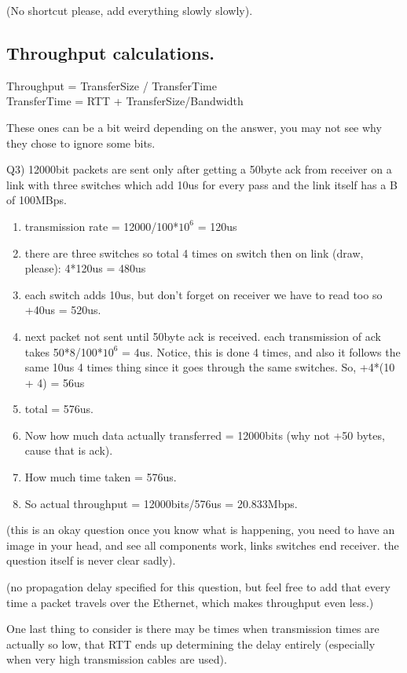\documentclass[12pt]{book}
\begin{document}
(No shortcut please, add everything slowly slowly).

\subsection{Throughput calculations.}

Throughput = TransferSize / TransferTime \\
TransferTime = RTT + TransferSize/Bandwidth\par

These ones can be a bit weird depending on the answer, you may not see why they chose to ignore some bits.\par
Q3) 12000bit packets are sent only after getting a 50byte ack from receiver on a link with three switches which add 10us for every pass and the link itself has a B of 100MBps.
\begin{enumerate}
    \item transmission rate = 12000/100*$10^{6}$ = 120us
    \item there are three switches so total 4 times on switch then on link (draw, please): 4*120us = 480us
    \item each switch adds 10us, but don't forget on receiver we have to read too so +40us = 520us.
    \item next packet not sent until 50byte ack is received. each transmission of ack takes 50*8/100*$10^{6}$ = 4us. Notice, this is done 4 times, and also it follows the same 10us 4 times thing since it goes through the same switches. So, +4*(10 + 4) = 56us
    \item total = 576us.
    \item Now how much data actually transferred = 12000bits (why not +50 bytes, cause that is ack).
    \item How much time taken = 576us.
    \item So actual throughput = 12000bits/576us = 20.833Mbps.
\end{enumerate}
(this is an okay question once you know what is happening, you need to have an image in your head, and see all components work, links switches end receiver. the question itself is never clear sadly).\par
(no propagation delay specified for this question, but feel free to add that every time a packet travels over the Ethernet, which makes throughput even less.)\parskip\parskip

One last thing to consider is there may be times when transmission times are actually so low, that RTT ends up determining the delay entirely (especially when very high transmission cables are used).
\end{document}
